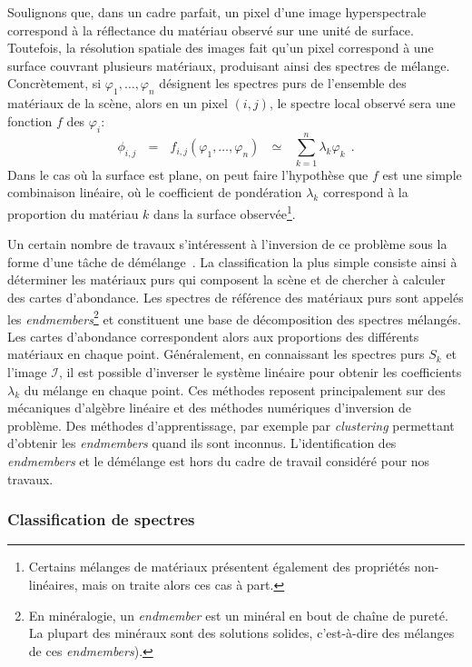 Soulignons que, dans un cadre parfait, un pixel d'une image hyperspectrale correspond à la réflectance du matériau observé sur une unité de surface. Toutefois, la résolution spatiale des images fait qu'un pixel correspond à une surface couvrant plusieurs matériaux, produisant ainsi des spectres de mélange. Concrètement, si $\varphi_1, \dots, \varphi_n$ désignent les spectres purs de l'ensemble des matériaux de la scène, alors en un pixel $(i,j)$, le spectre local observé sera une fonction $f$ des $\varphi_i$:
\begin{equation}
  \phi_{i,j}~~~=~~~f_{i,j}(\varphi_1, \dots, \varphi_n)~~~\simeq~~~\sum_{k = 1}^n \lambda_k \varphi_k~~.
\end{equation}
Dans le cas où la surface est plane, on peut faire l'hypothèse que $f$ est une simple combinaison linéaire, où le coefficient de pondération $\lambda_k$ correspond à la proportion du matériau $k$ dans la surface observée\footnote{Certains mélanges de matériaux présentent également des propriétés non-linéaires, mais on traite alors ces cas à part.}.

Un certain nombre de travaux s'intéressent à l'inversion de ce problème sous la forme d'une tâche de démélange~\cite{parra_unmixing_1999}. La classification la plus simple consiste ainsi à déterminer les matériaux purs qui composent la scène et de chercher à calculer des cartes d'abondance. Les spectres de référence des matériaux purs sont appelés les \emph{endmembers}\footnote{En minéralogie, un \emph{endmember} est un minéral en bout de chaîne de pureté. La plupart des minéraux sont des solutions solides, c'est-à-dire des mélanges de ces \emph{endmembers}).} et constituent une base de décomposition des spectres mélangés. Les cartes d'abondance correspondent alors aux proportions des différents matériaux en chaque point. Généralement, en connaissant les spectres purs $S_k$ et l'image $\mathcal{I}$, il est possible d'inverser le système linéaire pour obtenir les coefficients $\lambda_k$ du mélange en chaque point. Ces méthodes reposent principalement sur des mécaniques d'algèbre linéaire et des méthodes numériques d'inversion de problème. Des méthodes d'apprentissage, par exemple par \emph{clustering} permettant d'obtenir les \emph{endmembers} quand ils sont inconnus. L'identification des \emph{endmembers} et le démélange est hors du cadre de travail considéré pour nos travaux.

\subsubsection{Classification de spectres}

